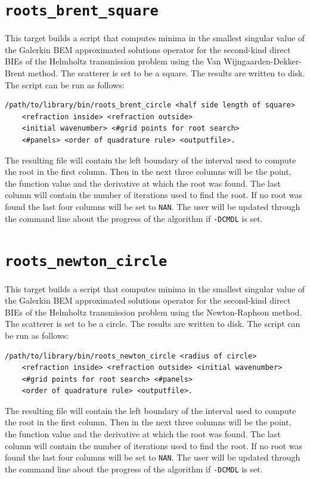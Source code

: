 \documentclass[a4paper, oneside]{thirdparty_stylesheets/discothesis}
\begin{document}
\cprotect\section{\verb|roots_brent_square|}
This target builds a script that computes minima in the smallest singular value of the
Galerkin BEM approximated solutions operator for the second-kind direct BIEs of the Helmholtz
transmission problem using the Van Wijngaarden-Dekker-Brent method.
The scatterer is set to be a square.
The results are written to disk.
The script can be run as follows:
\begin{verbatim}
/path/to/library/bin/roots_brent_circle <half side length of square> 
	<refraction inside> <refraction outside> 
	<initial wavenumber> <#grid points for root search> 
	<#panels> <order of quadrature rule> <outputfile>.
\end{verbatim}
The resulting file will contain the left boundary of the interval used to compute the root in the first column. 
Then in the next three columns will be the point, the function value and the derivative at which the root was found.
The last column will contain the number of iterations used to find the root.
If no root was found the last four columns will be set to \verb|NAN|.
The user will be updated through the command line about the progress of the algorithm if \verb|-DCMDL| is set.

\cprotect\section{\verb|roots_newton_circle|}
This target builds a script that computes minima in the smallest singular value of the
Galerkin BEM approximated solutions operator for the second-kind direct BIEs of the Helmholtz
transmission problem using the Newton-Raphson method.
The scatterer is set to be a circle.
The results are written to disk.
The script can be run as follows:
\begin{verbatim}
/path/to/library/bin/roots_newton_circle <radius of circle> 
	<refraction inside> <refraction outside> <initial wavenumber> 
	<#grid points for root search> <#panels> 
	<order of quadrature rule> <outputfile>.
\end{verbatim}
The resulting file will contain the left boundary of the interval used to compute the root in the first column. 
Then in the next three columns will be the point, the function value and the derivative at which the root was found.
The last column will contain the number of iterations used to find the root.
If no root was found the last four columns will be set to \verb|NAN|.
The user will be updated through the command line about the progress of the algorithm if \verb|-DCMDL| is set.
\end{document}
